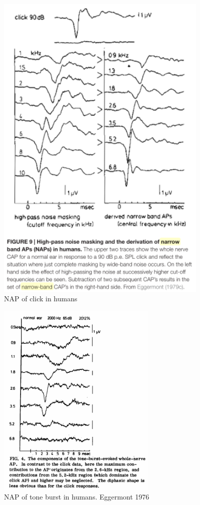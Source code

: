 \documentclass[]{article}
\begin{document}
\begin{figure}
\centering
\includegraphics[width=4.00000in]{./figures/NAP_click.png}
\caption{NAP of click in humans}
\end{figure}

\begin{figure}
\centering
\includegraphics[width=3.00000in]{./figures/NAP_tone.png}
\caption{NAP of tone burst in humans. Eggermont 1976}
\end{figure}
\end{document}
